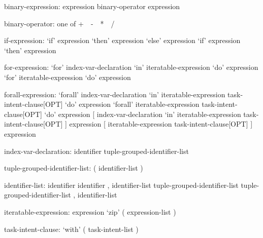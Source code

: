 \begin{syntax}
binary-expression:
  expression binary-operator expression
\end{syntax}

\begin{syntax}
binary-operator: one of
  + $ $ $ $ - $ $ $ $ * $ $ $ $ / $ $ $ $ %
\end{syntax}

\begin{syntax}
if-expression:
  `if' expression `then' expression `else' expression
  `if' expression `then' expression
\end{syntax}

\begin{syntax}
for-expression:
  `for' index-var-declaration `in' iteratable-expression `do' expression
  `for' iteratable-expression `do' expression
\end{syntax}

\begin{syntax}
forall-expression:
  `forall' index-var-declaration `in' iteratable-expression task-intent-clause[OPT] `do' expression
  `forall' iteratable-expression task-intent-clause[OPT] `do' expression
  [ index-var-declaration `in' iteratable-expression task-intent-clause[OPT] ] expression
  [ iteratable-expression task-intent-clause[OPT] ] expression
\end{syntax}

\begin{syntax}
index-var-declaration:
  identifier
  tuple-grouped-identifier-list
\end{syntax}

\begin{syntax}
tuple-grouped-identifier-list:
  ( identifier-list )
\end{syntax}

\begin{syntax}
identifier-list:
  identifier
  identifier , identifier-list
  tuple-grouped-identifier-list
  tuple-grouped-identifier-list , identifier-list
\end{syntax}

\begin{syntax}
iteratable-expression:
  expression
  `zip' ( expression-list )
\end{syntax}

\begin{syntax}
task-intent-clause:
  `with' ( task-intent-list )
\end{syntax}

